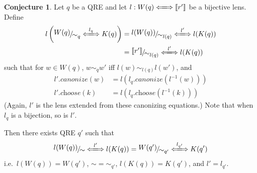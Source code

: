 \documentclass[a4paper,11pt] {article}
\theoremstyle{definition}
\newtheorem{conjecture}[theorem]{Conjecture}
\newcommand{\lcanonize}[1]{\textit{$#1$.canonize}}
\newcommand{\lchoose}[1]{\textit{$#1$.choose}}
\newcommand{\lensbetween}[1]{\xLongleftrightarrow{#1}}
\newcommand{\niceFrac}[2]{%
    \raise.5ex\hbox{$#1$}%
    \kern-.1em/\kern-.15em%
    \lower.25ex\hbox{$#2$}}
\begin{document}
\begin{conjecture}
  \label{thm:lens-functor}
  Let $q$ be a QRE and
  let $l: W(q) \lensbetween{} \llbracket r' \rrbracket$ be a bijective lens.
  Define
  \begin{align*}
    l\left(\niceFrac{W(q)}{\sim_q} \lensbetween{l_q} K(q)\right)
    &= \niceFrac{l(W(q))}{\sim_{l(q)}} \lensbetween{l'} l(K(q)) \\
    &= \niceFrac{\llbracket r' \rrbracket}{\sim_{l(q)}} \lensbetween{l'} l(K(q))
  \end{align*}
  such that for $w \in W(q)$, $w \sim_q w'$ iff $l(w) \sim_{l(q)} l(w')$,
  and
  \begin{align*}
    \lcanonize{l'}(w)
    &= l(\lcanonize{l_q}(l^{-1}(w))) \\
    \lchoose{l'}(k)
    &= l(\lchoose{l_q}(l^{-1}(k)))
  \end{align*}
  (Again, $l'$ is the lens extended from these canonizing equations.)
  Note that when $l_q$ is a bijection, so is $l'$.
  
  Then there exists QRE $q'$ such that
  \begin{align*}
    \niceFrac{l(W(q))}{\sim} \lensbetween{l'} l(K(q))
    = \niceFrac{W(q')}{\sim_{q'}} \lensbetween{l_{q'}} K(q')
  \end{align*}
  i.e.\ $l(W(q)) = W(q')$, $\sim{} = {}\sim_{q'}$, $l(K(q)) = K(q')$,
  and $l' = l_{q'}$.
\end{conjecture}
\end{document}
